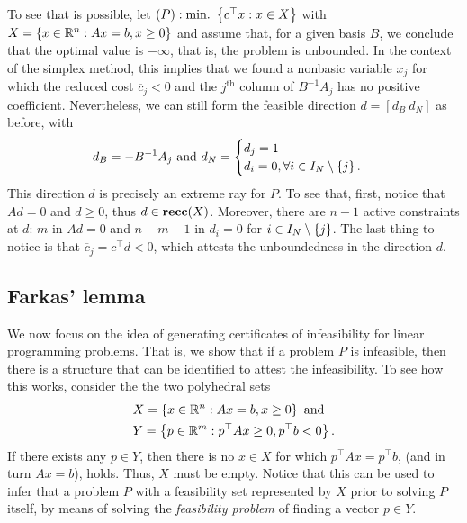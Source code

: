 To see that is possible, let $(P) : \mathop{\text{min.~}}\left\{ c^\top x : x \in X \right \}$ with $X = \left\{ x \in \mathbb{R}^n : Ax = b, x \geq 0 \right \}$ and assume that, for a given basis $B$, we conclude that the optimal value is $-\infty$, that is, the problem is unbounded. In the context of the simplex method, this implies that we found a nonbasic variable $x_j$ for which the reduced cost $\overline{c}_j < 0$ and the $j^\text{th}$ column of $B^{-1}A_j$ has no positive coefficient. Nevertheless, we can still form the feasible direction $d= [d_B ~ d_N]$ as before, with
%
\begin{equation*}
	d_B = -B^{-1}A_j \text{ and } 
	d_N = \begin{cases}
 		d_j = 1 \\
 		d_i = 0, \forall i \in I_N \setminus \left\{ j \right \}.
 	\end{cases}
\end{equation*}
%
This direction $d$ is precisely an extreme ray for $P$. To see that, first, notice that $Ad = 0$ and $d \geq 0$, thus	$d \in {\bf recc}(X)$. Moreover, there are $n-1$ active constraints at $d$: $m$ in $Ad = 0$ and $n-m-1$ in $d_i = 0$ for $i \in I_N \setminus \left\{ j \right \}$. The last thing to notice is that $\overline{c}_j = c^\top d < 0$, which attests the unboundedness in the direction $d$. 

 

\subsection{Farkas' lemma}

We now focus on the idea of generating certificates of infeasibility for linear programming problems. That is, we show that if a problem $P$ is infeasible, then there is a structure that can be identified to attest the infeasibility. To see how this works, consider the the two polyhedral sets
%
\begin{align*}
	&X = \left\{ x \in \mathbb{R}^n : Ax = b,  x \geq 0 \right \} \text{ and } \\ 
	&Y = \left\{ p \in \mathbb{R}^m : p^\top A x \geq 0, p^\top b < 0 \right \}.
\end{align*}
%
If there exists any $p \in Y$, then there is no $x \in X$ for which $p^\top Ax = p^\top b$, (and in turn $Ax = b$), holds. Thus, $X$ must be empty. Notice that this can be used to infer that a problem $P$ with a feasibility set represented by $X$ prior to solving $P$ itself, by means of solving the \emph{feasibility problem} of finding a vector $p \in Y$. 

